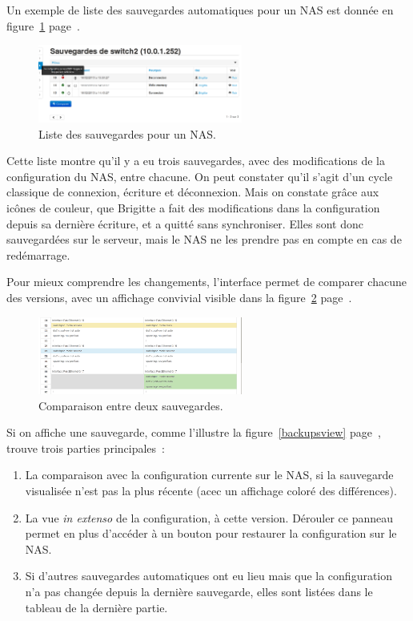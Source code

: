 Un exemple de liste des sauvegardes automatiques pour un NAS est donnée en figure~\ref{backups} page~\pageref{backups}.

\begin{figure}[!h]
	\begin{center}
	    \includegraphics[width=0.6\textwidth]{img/backups.png}
	\end{center}
	\caption{Liste des sauvegardes pour un NAS.}
	\label{backups}
\end{figure}

Cette liste montre qu'il y a eu trois sauvegardes, avec des modifications de la configuration du NAS, entre chacune. On peut constater qu'il s'agit d'un cycle classique de connexion, écriture et déconnexion. Mais on constate grâce aux icônes de couleur, que Brigitte a fait des modifications dans la configuration depuis sa dernière écriture, et a quitté sans synchroniser. Elles sont donc sauvegardées sur le serveur, mais le NAS ne les prendre pas en compte en cas de redémarrage.

Pour mieux comprendre les changements, l'interface permet de comparer chacune des versions, avec un affichage convivial visible dans la figure~\ref{backupsdiff} page~\pageref{backupsdiff}.

\begin{figure}[!h]
	\begin{center}
	    \includegraphics[width=0.6\textwidth]{img/backupsdiff.png}
	\end{center}
	\caption{Comparaison entre deux sauvegardes.}
	\label{backupsdiff}
\end{figure}

Si on affiche une sauvegarde, comme l'illustre la figure~\ref{backupsview} page~\pageref{backupsview}, trouve trois parties principales~:

\begin{enumerate}
\item La comparaison avec la configuration currente sur le NAS, si la sauvegarde visualisée n'est pas la plus récente (acec un affichage coloré des différences).
\item La vue \emph{in extenso} de la configuration, à cette version. Dérouler ce panneau permet en plus d'accéder à un bouton pour restaurer la configuration sur le NAS.
\item Si d'autres sauvegardes automatiques ont eu lieu mais que la configuration n'a pas changée depuis la dernière sauvegarde, elles sont listées dans le tableau de la dernière partie.
\end{enumerate}

